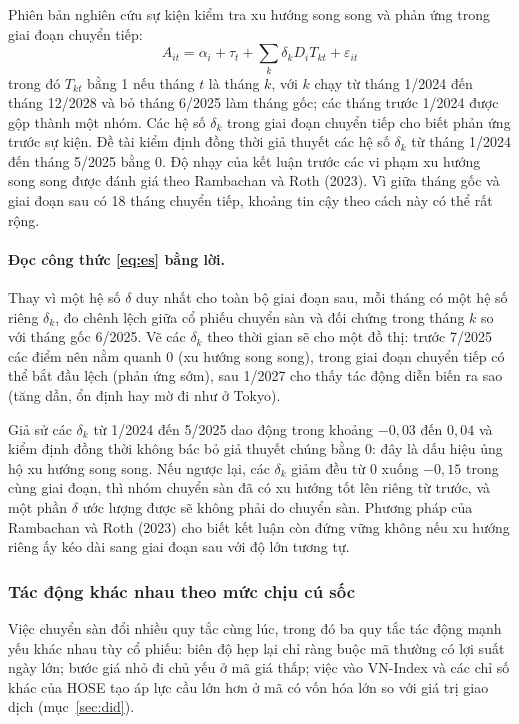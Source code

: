 Phiên bản nghiên cứu sự kiện kiểm tra xu hướng song song và phản ứng trong giai đoạn chuyển tiếp:
\begin{equation}\label{eq:es}
A_{it} = \alpha_i + \tau_t + \sum_k \delta_k D_i T_{kt} + \varepsilon_{it}
\end{equation}
trong đó $T_{kt}$ bằng 1 nếu tháng $t$ là tháng $k$, với $k$ chạy từ tháng 1/2024 đến tháng 12/2028 và bỏ tháng 6/2025 làm tháng gốc; các tháng trước 1/2024 được gộp thành một nhóm. Các hệ số $\delta_k$ trong giai đoạn chuyển tiếp cho biết phản ứng trước sự kiện. Đề tài kiểm định đồng thời giả thuyết các hệ số $\delta_k$ từ tháng 1/2024 đến tháng 5/2025 bằng 0. Độ nhạy của kết luận trước các vi phạm xu hướng song song được đánh giá theo Rambachan và Roth (2023). Vì giữa tháng gốc và giai đoạn sau có 18 tháng chuyển tiếp, khoảng tin cậy theo cách này có thể rất rộng.

\paragraph{Đọc công thức \eqref{eq:es} bằng lời.} Thay vì một hệ số $\delta$ duy nhất cho toàn bộ giai đoạn sau, mỗi tháng có một hệ số riêng $\delta_k$, đo chênh lệch giữa cổ phiếu chuyển sàn và đối chứng trong tháng $k$ so với tháng gốc 6/2025. Vẽ các $\delta_k$ theo thời gian sẽ cho một đồ thị: trước 7/2025 các điểm nên nằm quanh 0 (xu hướng song song), trong giai đoạn chuyển tiếp có thể bắt đầu lệch (phản ứng sớm), sau 1/2027 cho thấy tác động diễn biến ra sao (tăng dần, ổn định hay mờ đi như ở Tokyo).

\begin{vidu}
Giả sử các $\delta_k$ từ 1/2024 đến 5/2025 dao động trong khoảng $-0{,}03$ đến $0{,}04$ và kiểm định đồng thời không bác bỏ giả thuyết chúng bằng 0: đây là dấu hiệu ủng hộ xu hướng song song. Nếu ngược lại, các $\delta_k$ giảm đều từ $0$ xuống $-0{,}15$ trong cùng giai đoạn, thì nhóm chuyển sàn đã có xu hướng tốt lên riêng từ trước, và một phần $\delta$ ước lượng được sẽ không phải do chuyển sàn. Phương pháp của Rambachan và Roth (2023) cho biết kết luận còn đứng vững không nếu xu hướng riêng ấy kéo dài sang giai đoạn sau với độ lớn tương tự.
\end{vidu}

\subsubsection*{Tác động khác nhau theo mức chịu cú sốc}

Việc chuyển sàn đổi nhiều quy tắc cùng lúc, trong đó ba quy tắc tác động mạnh yếu khác nhau tùy cổ phiếu: biên độ hẹp lại chỉ ràng buộc mã thường có lợi suất ngày lớn; bước giá nhỏ đi chủ yếu ở mã giá thấp; việc vào VN-Index và các chỉ số khác của HOSE tạo áp lực cầu lớn hơn ở mã có vốn hóa lớn so với giá trị giao dịch (mục~\ref{sec:did}).

